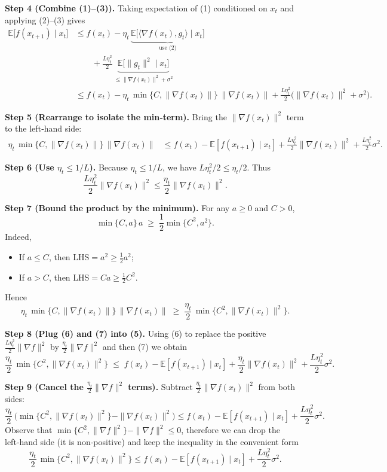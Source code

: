 \documentclass{article}
\begin{document}
\noindent\textbf{Step 4 (Combine (1)–(3)).}
Taking expectation of (1) conditioned on $x_t$ and applying (2)–(3) gives
\[
\begin{aligned}
\mathbb{E}\!\bigl[f(x_{t+1})\mid x_t\bigr]
&\le f(x_t)-\eta_t\,
\underbrace{\mathbb{E}\!\bigl[\langle\nabla f(x_t),g_t\rangle\mid x_t\bigr]}_{\text{use (2)}}\\
&\qquad
+\frac{L\eta_t^2}{2}\,
\underbrace{\mathbb{E}\!\bigl[\|g_t\|^2\mid x_t\bigr]}_{\le \|\nabla f(x_t)\|^2+\sigma^2}
\\[4pt]
&\le f(x_t)-\eta_t\,
\min\{C,\|\nabla f(x_t)\|\}\,\|\nabla f(x_t)\|
+\frac{L\eta_t^2}{2}\bigl(\|\nabla f(x_t)\|^2+\sigma^2\bigr). \tag{4}
\end{aligned}
\]

\noindent\textbf{Step 5 (Rearrange to isolate the min‑term).}
Bring the $\|\nabla f(x_t)\|^2$ term to the left‑hand side:
\[
\begin{aligned}
\eta_t\,
\min\{C,\|\nabla f(x_t)\|\}\,\|\nabla f(x_t)\|
&\le f(x_t)-\mathbb{E}[f(x_{t+1})\mid x_t]
+\frac{L\eta_t^2}{2}\|\nabla f(x_t)\|^2
+\frac{L\eta_t^2}{2}\sigma^2 .
\end{aligned}
\tag{5}
\]

\noindent\textbf{Step 6 (Use $\eta_t\le 1/L$).}
Because $\eta_t\le 1/L$, we have $L\eta_t^2/2\le \eta_t/2$.
Thus
\[
\frac{L\eta_t^2}{2}\|\nabla f(x_t)\|^2\le \frac{\eta_t}{2}\|\nabla f(x_t)\|^2 .
\tag{6}
\]

\noindent\textbf{Step 7 (Bound the product by the minimum).}
For any $a\ge0$ and $C>0$,
\[
\min\{C,a\}\,a \;\ge\; \frac12\min\{C^2,a^2\}.
\]
Indeed,
\begin{itemize}
\item If $a\le C$, then LHS$=a^2\ge \tfrac12 a^2$;
\item If $a>C$, then LHS$=Ca\ge \tfrac12 C^2$.
\end{itemize}
Hence
\[
\eta_t\,\min\{C,\|\nabla f(x_t)\|\}\,\|\nabla f(x_t)\|
\;\ge\;
\frac{\eta_t}{2}\,\min\{C^2,\|\nabla f(x_t)\|^2\}. \tag{7}
\]

\noindent\textbf{Step 8 (Plug (6) and (7) into (5).}
Using (6) to replace the positive $\tfrac{L\eta_t^2}{2}\|\nabla f\|^2$
by $\tfrac{\eta_t}{2}\|\nabla f\|^2$ and then (7) we obtain
\[
\frac{\eta_t}{2}\,\min\{C^2,\|\nabla f(x_t)\|^2\}
\;\le\;
f(x_t)-\mathbb{E}[f(x_{t+1})\mid x_t]
+\frac{\eta_t}{2}\|\nabla f(x_t)\|^2
+\frac{L\eta_t^2}{2}\sigma^2 .
\tag{8}
\]

\noindent\textbf{Step 9 (Cancel the $\tfrac{\eta_t}{2}\|\nabla f\|^2$ terms).}
Subtract $\frac{\eta_t}{2}\|\nabla f(x_t)\|^2$ from both sides:
\[
\frac{\eta_t}{2}\,\bigl(\min\{C^2,\|\nabla f(x_t)\|^2\}
-\|\nabla f(x_t)\|^2\bigr)
\le f(x_t)-\mathbb{E}[f(x_{t+1})\mid x_t]
+\frac{L\eta_t^2}{2}\sigma^2 .
\tag{9}
\]
Observe that $\min\{C^2,\|\nabla f\|^2\}-\|\nabla f\|^2\le 0$, therefore we can drop the
left‑hand side (it is non‑positive) and keep the inequality in the convenient
form
\[
\frac{\eta_t}{2}\,\min\{C^2,\|\nabla f(x_t)\|^2\}
\le f(x_t)-\mathbb{E}[f(x_{t+1})\mid x_t]
+\frac{L\eta_t^2}{2}\sigma^2 .
\tag{10}
\]
\end{document}
